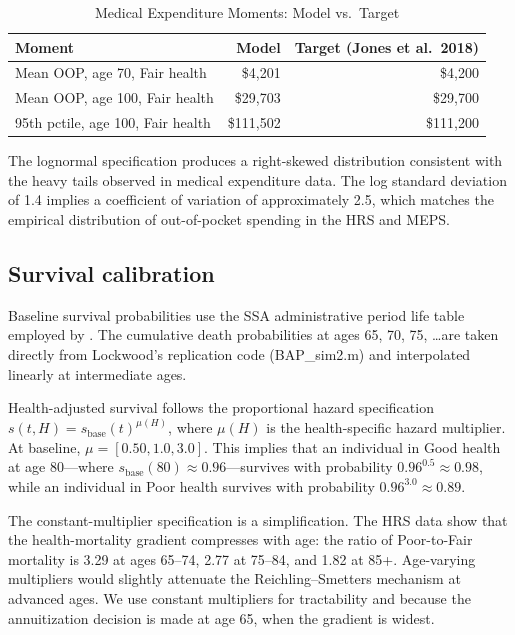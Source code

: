 \documentclass[12pt]{article}
\begin{document}
\begin{table}[htbp]
\centering
\caption{Medical Expenditure Moments: Model vs.\ Target}
\label{tab:medical_moments}
\begin{tabular}{lrr}
\toprule
Moment & Model & Target (Jones et al.\ 2018) \\
\midrule
Mean OOP, age 70, Fair health & \$4,201 & \$4,200 \\
Mean OOP, age 100, Fair health & \$29,703 & \$29,700 \\
95th pctile, age 100, Fair health & \$111,502 & \$111,200 \\
\bottomrule
\end{tabular}
\end{table}

The lognormal specification produces a right-skewed distribution consistent with the heavy tails observed in medical expenditure data. The log standard deviation of 1.4 implies a coefficient of variation of approximately 2.5, which matches the empirical distribution of out-of-pocket spending in the HRS and MEPS.

\subsection{Survival calibration}
\label{app:survival}

Baseline survival probabilities use the SSA administrative period life table employed by \citet{lockwood2012}. The cumulative death probabilities at ages 65, 70, 75, \ldots are taken directly from Lockwood's replication code (BAP\_sim2.m) and interpolated linearly at intermediate ages.

Health-adjusted survival follows the proportional hazard specification $s(t, H) = s_{\text{base}}(t)^{\mu(H)}$, where $\mu(H)$ is the health-specific hazard multiplier. At baseline, $\mu = [0.50, 1.0, 3.0]$. This implies that an individual in Good health at age 80---where $s_{\text{base}}(80) \approx 0.96$---survives with probability $0.96^{0.5} \approx 0.98$, while an individual in Poor health survives with probability $0.96^{3.0} \approx 0.89$.

The constant-multiplier specification is a simplification. The HRS data show that the health-mortality gradient compresses with age: the ratio of Poor-to-Fair mortality is 3.29 at ages 65--74, 2.77 at 75--84, and 1.82 at 85+. Age-varying multipliers would slightly attenuate the Reichling--Smetters mechanism at advanced ages. We use constant multipliers for tractability and because the annuitization decision is made at age 65, when the gradient is widest.
\end{document}
